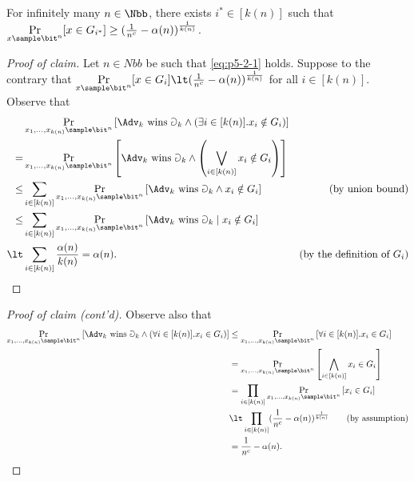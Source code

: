 \begin{answer}[ii]
    \begin{claim}\label{claim:p5-2-2}
        For infinitely many $n\in\Nbb$, there exists $i^\ast\in[k(n)]$ such that $\Pr\limits_{x\sample \bit^n}[x\in G_{i^\ast}]\ge (\frac{1}{n^c}-\alpha(n))^{\frac{1}{k(n)}}$.
    \end{claim}
    \begin{proof}[Proof of claim]
        Let $n\in Nbb$ be such that \eqref{eq:p5-2-1} holds.
        Suppose to the contrary that $\Pr\limits_{x\sample \bit^n}[x\in G_{i}]\lt (\frac{1}{n^c}-\alpha(n))^{\frac{1}{k(n)}}$ for all $i\in[k(n)]$. Observe that 
        \begin{align*}
            &\Pr_{x_1,\ldots,x_{k(n)}\sample \bit^{n}}\left[\Adv_{k} \textrm{ wins } \Game_k \land (\exists i\in[k(n)]. x_i\notin G_i) \right]\\
            =& \Pr_{x_1,\ldots,x_{k(n)}\sample \bit^{n}}\left[\Adv_{k} \textrm{ wins } \Game_k \land \left(\bigvee_{i\in[k(n)]} x_i\notin G_i\right) \right] \\
            \le& \sum_{i\in[k(n)]}\Pr_{x_1,\ldots,x_{k(n)}\sample \bit^{n}}\left[\Adv_{k} \textrm{ wins } \Game_k \land x_i\notin G_i \right] 
            & \textrm{(by union bound)}\\
            \le& \sum_{i\in[k(n)]}\Pr_{x_1,\ldots,x_{k(n)}\sample \bit^{n}}\left[\Adv_{k} \textrm{ wins } \Game_k \mid x_i\notin G_i \right] \\
            \lt& \sum_{i\in[k(n)]} \frac{\alpha(n)}{k(n)} =\alpha(n).
            & \textrm{(by the definition of $G_i$)}\\
        \end{align*}
        \end{proof}\begin{proof}[Proof of claim (cont'd)]
        Observe also that 
        \begin{align*}
            \Pr_{x_1,\ldots,x_{k(n)}\sample \bit^{n}}\left[\Adv_{k} \textrm{ wins } \Game_k \land (\forall i\in[k(n)]. x_i\in G_i) \right]
            &\le \Pr_{x_1,\ldots,x_{k(n)}\sample \bit^{n}}\left[\forall i\in[k(n)]. x_i\in G_i \right]\\
            &= \Pr_{x_1,\ldots,x_{k(n)}\sample \bit^{n}}\left[\bigwedge_{i\in[k(n)]} x_i\in G_i \right]\\
            &= \prod_{i\in[k(n)]} \Pr_{x_1,\ldots,x_{k(n)}\sample \bit^{n}}\left[ x_i\in G_i \right]\\
            &\lt \prod_{i\in[k(n)]}  (\frac{1}{n^c}-\alpha(n))^{\frac{1}{k(n)}}
            \qquad \textrm{(by assumption)}\\
            &= \frac{1}{n^c}-\alpha(n).
        \end{align*}


\end{proof}
\end{answer}
